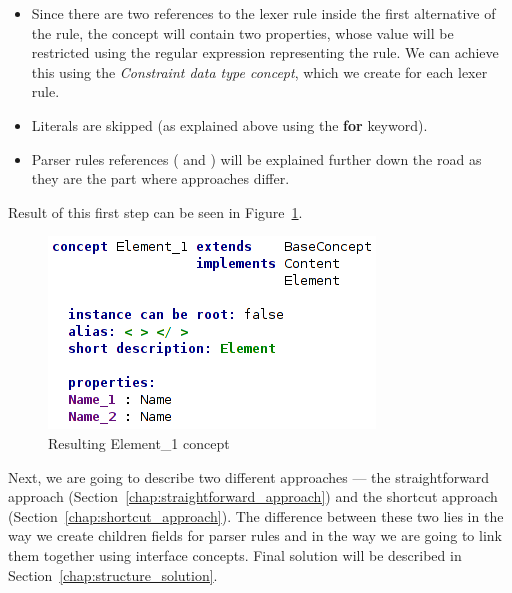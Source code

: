 \begin{itemize}
	\item Since there are two references to the  lexer rule inside the first alternative of the  rule, the  concept will contain two properties, whose value will be restricted using the regular expression representing the  rule.
	We can achieve this using the \textit{Constraint data type concept}, which we create for each lexer rule.

	\item Literals are skipped (as explained above using the \textbf{for} keyword).

	\item Parser rules references ( and ) will be explained further down the road as they are the part where approaches differ.
\end{itemize}

Result of this first step can be seen in Figure~\ref{fig:element_concept_common}.

\begin{figure}[h]
	\centering
	\includegraphics[scale=0.75]{./img/element_concept_common.png}
	\caption{Resulting Element{\_}1 concept}
	\label{fig:element_concept_common}
\end{figure}

Next, we are going to describe two different approaches --- the straightforward approach (Section~\ref{chap:straightforward_approach}) and the shortcut approach (Section~\ref{chap:shortcut_approach}).
The difference between these two lies in the way we create children fields for parser rules and in the way we are going to link them together using interface concepts.
Final solution will be described in Section~\ref{chap:structure_solution}.

\newpage






